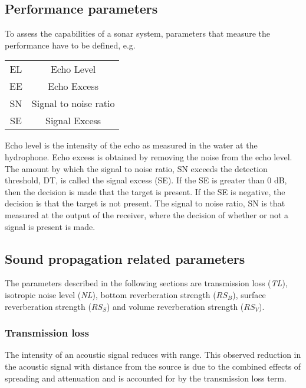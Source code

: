 \subsection{ Performance parameters } \label{ Performance parameters }
\noindent To assess the capabilities of a sonar system, parameters that measure the performance have to be defined, e.g.
\begin{center}
\begin{tabular}{ |c|c| } 
 \hline
  EL & Echo Level  \\ 
  EE & Echo Excess  \\ 
  SN & Signal to noise ratio  \\ 
  SE & Signal Excess \\
  \hline
\end{tabular}
\end{center}
\noindent Echo level is the intensity of the echo as measured in the water at the hydrophone. Echo excess is obtained by removing the noise from the echo level. The amount by which the signal to noise ratio, SN exceeds the detection threshold, DT, is called the signal excess (SE). If the SE is greater than 0 dB, then the decision is made that the target is present. If the SE is negative, the decision is that the target is not present. The signal to noise ratio, SN is that measured at the output of the receiver, where the decision of whether or not a signal is present is made.

\newpage

\subsection{ Sound propagation related parameters } \label{ Sound propagation related parameters }
\noindent The parameters described in the following sections are transmission loss (\textit{TL}), isotropic noise level (\textit{NL}), bottom reverberation strength (\textit{$RS_B$}), surface reverberation strength (\textit{$RS_S$}) and volume reverberation strength (\textit{$RS_V$}).

\subsubsection{ Transmission loss } \label{ Transmission loss }
\noindent The intensity of an acoustic signal reduces with range. This observed reduction in the acoustic signal with distance from the source is due to the combined effects of spreading and attenuation and is accounted for by the transmission loss term.

